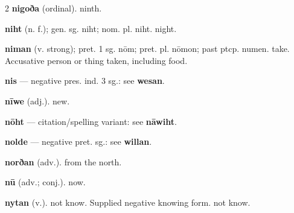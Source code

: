 \begin{multicols*}{2}
\textbf{nigoða} (ordinal). ninth.\par
\textbf{niht} (n. f.); gen. sg. niht; nom. pl. niht. night.\par
\textbf{niman} (v. strong); pret. 1 sg. nōm; pret. pl. nōmon; past ptcp. numen. take. Accusative person or thing taken, including food.\par
\textbf{nis} — negative pres. ind. 3 sg.: see \textbf{wesan}.\par
\textbf{nīwe} (adj.). new.\par
\textbf{nōht} — citation/spelling variant: see \textbf{nāwiht}.\par
\textbf{nolde} — negative pret. sg.: see \textbf{willan}.\par
\textbf{norðan} (adv.). from the north.\par
\textbf{nū} (adv.; conj.). now.\par
\textbf{nytan} (v.). not know. Supplied negative knowing form. not know.\par

\end{multicols*}

